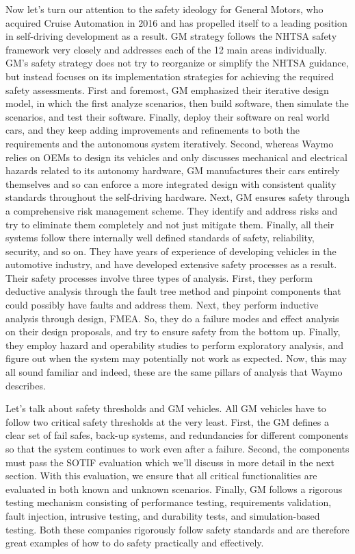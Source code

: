 Now let's turn our attention to the safety ideology for General Motors, who acquired Cruise Automation in 2016 and has propelled 
itself to a leading position in self-driving development as a result. GM strategy follows the NHTSA safety framework very closely and 
addresses each of the 12 main areas individually. GM's safety strategy does not try to reorganize or simplify the NHTSA guidance, 
but instead focuses on its implementation strategies for achieving the required safety assessments. 
First and foremost, GM emphasized their iterative design model, in which the first analyze scenarios, then build software, 
then simulate the scenarios, and test their software. Finally, deploy their software on real world cars, 
and they keep adding improvements and refinements to both the requirements and the autonomous system iteratively. 
Second, whereas Waymo relies on OEMs to design its vehicles and only discusses mechanical and electrical hazards related to 
its autonomy hardware, GM manufactures their cars entirely themselves and so can enforce a more integrated 
design with consistent quality standards throughout the self-driving hardware. Next, GM ensures safety through a comprehensive risk management scheme. 
They identify and address risks and try to eliminate them completely and not just mitigate them. 
Finally, all their systems follow there internally well defined standards of safety, reliability, security, and so on. 
They have years of experience of developing vehicles in the automotive industry, and have developed extensive safety processes as a result. 
Their safety processes involve three types of analysis. First, they perform deductive analysis through the fault tree method and pinpoint components that 
could possibly have faults and address them. Next, they perform inductive analysis through design, FMEA. 
So, they do a failure modes and effect analysis on their design proposals, and try to ensure safety from the bottom up. 
Finally, they employ hazard and operability studies to perform exploratory analysis, and figure out when the system may potentially not work as expected. 
Now, this may all sound familiar and indeed, these are the same pillars of analysis that Waymo describes. 

Let's talk about safety thresholds and GM vehicles. 
All GM vehicles have to follow two critical safety thresholds at the very least. 
First, the GM defines a clear set of fail safes, back-up systems, and redundancies for different components so 
that the system continues to work even after a failure. 
Second, the components must pass the SOTIF evaluation which we'll discuss in more detail in the next section. 
With this evaluation, we ensure that all critical functionalities are evaluated in both known and unknown scenarios. 
Finally, GM follows a rigorous testing mechanism consisting of performance testing, requirements validation, fault injection, intrusive testing, and durability tests, 
and simulation-based testing. Both these companies rigorously follow safety standards and are therefore great examples of how to do 
safety practically and effectively. 

